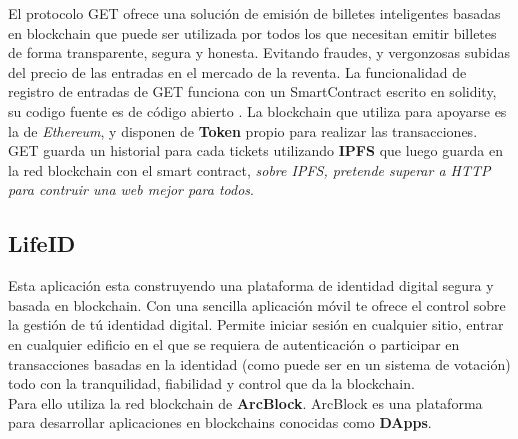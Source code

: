 El protocolo GET ofrece una solución de emisión de billetes inteligentes basadas en blockchain que puede ser utilizada por todos los que necesitan emitir billetes de forma transparente, segura y honesta. Evitando fraudes, y vergonzosas subidas del precio de las entradas en el mercado de la reventa. La funcionalidad de registro de entradas de GET funciona con un SmartContract escrito en solidity, su codigo fuente es de código abierto \cite{srcGET}. La blockchain que utiliza para apoyarse es la de \emph{Ethereum}, y disponen de \textbf{Token} propio para realizar las transacciones\cite{tokGET}. GET guarda un historial para cada tickets utilizando \textbf{IPFS}\cite{IPFS} que luego guarda en la red blockchain con el smart contract, \emph{sobre IPFS, pretende superar a HTTP para contruir una web mejor para todos}.

\subsection{LifeID}

Esta aplicación esta construyendo una plataforma de identidad digital segura y basada en blockchain. Con una sencilla aplicación móvil te ofrece el control sobre la gestión de tú identidad digital. Permite iniciar sesión en cualquier sitio, entrar en cualquier edificio en el que se requiera de autenticación o participar en transacciones basadas en la identidad (como puede ser en un sistema de votación) todo con la tranquilidad, fiabilidad y control que da la blockchain. \\ 

Para ello utiliza la red blockchain de \textbf{ArcBlock}\cite{webArc,alianzaArc}. ArcBlock es una plataforma para desarrollar aplicaciones en blockchains conocidas como \textbf{DApps}\cite{dapps}. 


